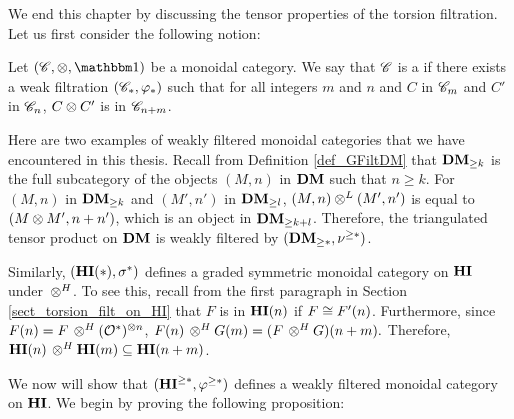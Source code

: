 We end this chapter by discussing the tensor properties of the 
torsion filtration. Let us first consider the following notion:

\begin{defn}\label{def_graded_tensor}
  Let $(\Cat{C}, \tensor, \Unit)$ be a monoidal category. We say that
  $\Cat{C}$ is a  if there
  exists a weak filtration $(\Cat{C}_*, \phi_*)$ such that for all
  integers $m$ and $n$ and $C$ in $\Cat{C}_m$ and $C'$ in $\Cat{C}_n$,
  $C \tensor C'$ is in $\Cat{C}_{n+m}$.
\end{defn}

\begin{ex}
Here are two examples of weakly filtered monoidal categories
that we have encountered in this thesis. Recall from Definition 
\ref{def_GFiltDM} that $\GFiltDM[k]{\DM}$ is the full subcategory
of the objects $(M, n)$ in $\DM$ such that $n \geq k$. For $(M, n)$
in $\GFiltDM[k]{\DM}$ and $(M', n')$ in $\GFiltDM[l]{\DM}$, $(M, n) \tDM (M', n')$
is equal to $(M \tensor M', n + n')$, which is an object in $\GFiltDM[k + l]{\DM}$.
Therefore, the triangulated tensor product on $\DM$ is weakly filtered
by $(\GFiltDM[*]{\DM}, \sgDM{*})$.

Similarly, $(\HI(*), \sgHI{*})$ defines a graded symmetric 
monoidal category on $\HI$ under $\tHI$. To see this, recall
from the first paragraph in Section \ref{sect_torsion_filt_on_HI}
that $F$ is in $\LHI[n]{\HI}$ if $F \cong \LHI[n]{F'}$. 
Furthermore, since $\LHI[n]{F} = F \tHI (\Ox)^{\tensor n}$, 
$\LHI[n]{F} \tHI \LHI[m]{G} = \LHI[n + m]{(F \tHI G)}.$ Therefore, 
$\LHI[n]{\HI} \tHI \LHI[m]{\HI} \subseteq \LHI[n + m]{\HI}$.
\end{ex}

We now will show that $(\THI{*}, \tgHI{*})$ defines a weakly filtered 
monoidal category on $\HI$. We begin by proving the following
proposition:

